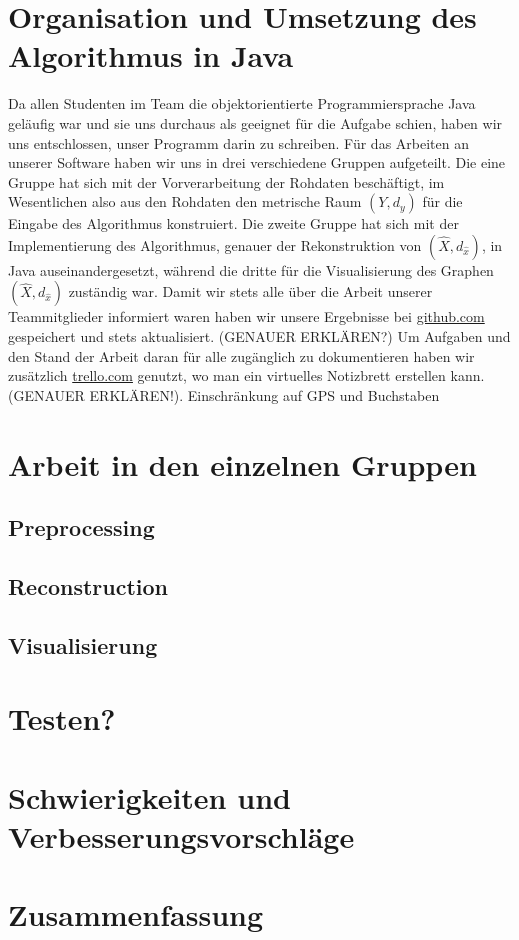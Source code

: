 \documentclass[parskip=half,
 fontsize=12pt, bibtotoc,
 ngerman]
 {article}
\begin{document}
\section{Organisation und Umsetzung des Algorithmus in Java}
Da allen Studenten im Team die objektorientierte Programmiersprache Java geläufig war und sie uns durchaus als geeignet für die Aufgabe schien, haben wir uns entschlossen, unser Programm darin zu schreiben. Für das Arbeiten an unserer Software haben wir uns in drei verschiedene Gruppen aufgeteilt. Die eine Gruppe hat sich mit der Vorverarbeitung der Rohdaten beschäftigt, im Wesentlichen also aus den Rohdaten den metrische Raum $\left(Y, d_y\right)$ für die Eingabe des Algorithmus konstruiert. Die zweite Gruppe hat sich mit der Implementierung des Algorithmus, genauer der Rekonstruktion von $(\hat{X}, d_{\hat{x}})$, in Java auseinandergesetzt, während die dritte für die Visualisierung des Graphen $(\hat{X}, d_{\hat{x}})$ zuständig war. Damit wir stets alle über die Arbeit unserer Teammitglieder informiert waren haben wir unsere Ergebnisse bei \url{github.com} gespeichert und stets aktualisiert. (GENAUER ERKLÄREN?) Um Aufgaben und den Stand der Arbeit daran für alle zugänglich zu dokumentieren haben wir zusätzlich \url{trello.com} genutzt, wo man ein virtuelles Notizbrett erstellen kann. (GENAUER ERKLÄREN!).\newline
Einschränkung auf GPS und Buchstaben\newline

 
\section{Arbeit in den einzelnen Gruppen}
\subsection{Preprocessing}
\subsection{Reconstruction}
\subsection{Visualisierung}

\section{Testen?}
\section{Schwierigkeiten und Verbesserungsvorschläge}
\section{Zusammenfassung}
\printbibliography
\end{document}
